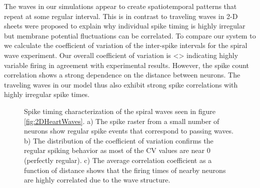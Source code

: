The waves in our simulations appear to create spatiotemporal patterns that repeat at some regular interval.
This is in contrast to \citet{keane2015} traveling waves in 2-D sheets were proposed to explain why individual spike timing is highly irregular 
but membrane potential fluctuations can be correlated.
To compare our system to \citet{keane2015} we calculate the coefficient of variation of the inter-spike intervals for the spiral wave experiment.
Our overall coefficient of variation is <> indicating highly variable firing in agreement with experimental results.
However, the spike count correlation shows a strong dependence on the distance between neurons.
The traveling waves in our model thus also exhibit strong spike correlations with highly irregular spike times.
\begin{figure}[!htb]
 \caption{Spike timing characterization of the spiral waves seen in figure \ref{fig:2DHeartWaves}.
          a) The spike raster from a small number of neurons show regular spike events that correspond to passing waves.
          b) The distribution of the coefficient of variation confirms the regular spiking behavior as most of the CV values are near 0 (perfectly regular).
          c) The average correlation coefficient as a function of distance shows that the firing times of nearby neurons are highly correlated due to the wave structure.
          } 
 \label{fig:2DSpiralWave_SpikeTiming}
\end{figure}
 \FloatBarrier
 

